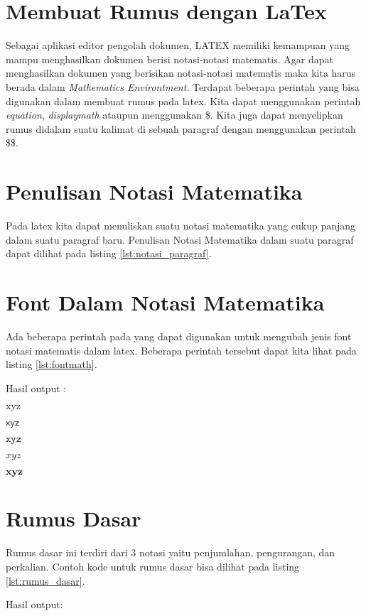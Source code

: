 \section{Membuat Rumus dengan LaTex}
Sebagai aplikasi editor pengolah dokumen, LATEX memiliki kemampuan yang mampu menghasilkan dokumen berisi notasi-notasi matematis. Agar dapat menghasilkan dokumen yang berisikan notasi-notasi matematis maka kita harus berada dalam \textit{Mathematics Environtment}. Terdapat beberapa perintah yang bisa digunakan dalam membuat rumus pada latex. Kita dapat menggunakan perintah \textit{equation}, \textit{displaymath} ataupun menggunakan \$. Kita juga dapat menyelipkan rumus didalam suatu kalimat di sebuah paragraf dengan menggunakan perintah \$\$.

\section{Penulisan Notasi Matematika}
Pada latex kita dapat menuliskan suatu notasi matematika yang cukup panjang dalam suatu paragraf baru. Penulisan Notasi Matematika dalam suatu paragraf dapat dilihat pada listing \ref{lst:notasi_paragraf}.


\section{Font Dalam Notasi Matematika}
Ada beberapa perintah pada yang dapat digunakan untuk mengubah jenis font notasi matematis dalam latex. Beberapa perintah tersebut dapat kita lihat pada listing \ref{lst:fontmath}.


Hasil output : 

$\mathrm{x y z}$

$\mathsf{x y z}$

$\mathtt{x y z}$

$\mathit{x y z}$

$\mathbf{x y z}$

\section{Rumus Dasar}
Rumus dasar ini terdiri dari 3 notasi yaitu penjumlahan, pengurangan, dan perkalian. Contoh kode untuk rumus dasar bisa dilihat pada listing \ref{lst:rumus_dasar}.

Hasil output:

